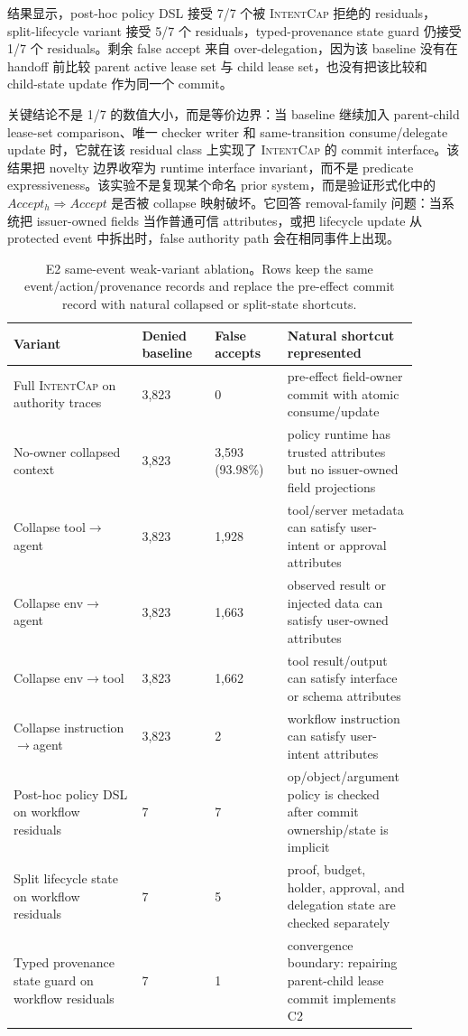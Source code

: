\documentclass[UTF8,a4paper,11pt]{ctexart}
\newcommand{\sys}{\textsc{IntentCap}\xspace}
\begin{document}
结果显示，post-hoc policy DSL 接受 7/7 个被 \sys 拒绝的 residuals，split-lifecycle variant 接受 5/7 个 residuals，typed-provenance state guard 仍接受 1/7 个 residuals。剩余 false accept 来自 over-delegation，因为该 baseline 没有在 handoff 前比较 parent active lease set 与 child lease set，也没有把该比较和 child-state update 作为同一个 commit。

关键结论不是 1/7 的数值大小，而是等价边界：当 baseline 继续加入 parent-child lease-set comparison、唯一 checker writer 和 same-transition consume/delegate update 时，它就在该 residual class 上实现了 \sys 的 commit interface。该结果把 novelty 边界收窄为 runtime interface invariant，而不是 predicate expressiveness。该实验不是复现某个命名 prior system，而是验证形式化中的 \(Accept_h\Rightarrow Accept\) 是否被 collapse 映射破坏。它回答 removal-family 问题：当系统把 issuer-owned fields 当作普通可信 attributes，或把 lifecycle update 从 protected event 中拆出时，false authority path 会在相同事件上出现。

\begin{table}[t]
\centering
\scriptsize
\setlength{\tabcolsep}{2pt}
\caption{E2 same-event weak-variant ablation。Rows keep the same event/action/provenance records and replace the pre-effect commit record with natural collapsed or split-state shortcuts.}
\label{tab:e2-weak-variant-ablation}
\begin{tabular}{p{0.30\linewidth}p{0.17\linewidth}p{0.17\linewidth}p{0.25\linewidth}}
\toprule
Variant & Denied baseline & False accepts & Natural shortcut represented \\
\midrule
Full \sys on authority traces & 3,823 & 0 & pre-effect field-owner commit with atomic consume/update \\
No-owner collapsed context & 3,823 & 3,593 (93.98\%) & policy runtime has trusted attributes but no issuer-owned field projections \\
Collapse tool\(\rightarrow\)agent & 3,823 & 1,928 & tool/server metadata can satisfy user-intent or approval attributes \\
Collapse env\(\rightarrow\)agent & 3,823 & 1,663 & observed result or injected data can satisfy user-owned attributes \\
Collapse env\(\rightarrow\)tool & 3,823 & 1,662 & tool result/output can satisfy interface or schema attributes \\
Collapse instruction\(\rightarrow\)agent & 3,823 & 2 & workflow instruction can satisfy user-intent attributes \\
Post-hoc policy DSL on workflow residuals & 7 & 7 & op/object/argument policy is checked after commit ownership/state is implicit \\
Split lifecycle state on workflow residuals & 7 & 5 & proof, budget, holder, approval, and delegation state are checked separately \\
Typed provenance state guard on workflow residuals & 7 & 1 & convergence boundary: repairing parent-child lease commit implements C2 \\
\bottomrule
\end{tabular}
\end{table}
\end{document}
